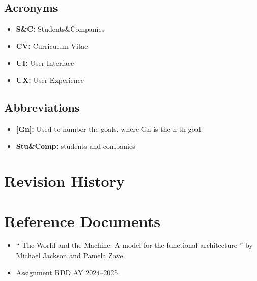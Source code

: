\subsection{Acronyms}\label{subsec:acronyms}
\begin{itemize}
    \item \textbf{S\&C:} Students\&Companies
    \item \textbf{CV:} Curriculum Vitae
    \item \textbf{UI:} User Interface
    \item \textbf{UX:} User Experience
\end{itemize}

\subsection{Abbreviations}\label{subsec:abbreviations}
\begin{itemize}
    \item \textbf{[Gn]:} Used to number the goals, where Gn is the n-th goal.
    \item \textbf{Stu\&Comp:} students and companies
\end{itemize}

\section{Revision History}\label{sec:revisionhistory}

\section{Reference Documents}\label{sec:reference}
\begin{itemize}
    \item `` The World and the Machine: A model for the functional architecture '' by Michael Jackson and Pamela Zave.
    \item Assignment RDD AY 2024–2025.
\end{itemize}

